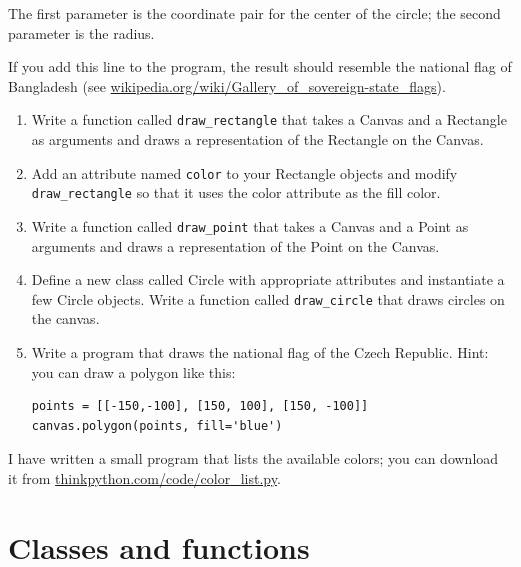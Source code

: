 \documentclass[10pt]{book}
\begin{document}
\begin{ex}

The first parameter is the coordinate pair for the center of the
circle; the second parameter is the radius.

If you add this line to the program, 
the result should resemble the national flag of Bangladesh
(see \url{wikipedia.org/wiki/Gallery_of_sovereign-state_flags}).

\begin{enumerate}

\item Write a function called \verb"draw_rectangle" that takes a
  Canvas and a Rectangle as arguments and draws a
  representation of the Rectangle on the Canvas.

\item Add an attribute named {\tt color} to your Rectangle objects and
  modify \verb"draw_rectangle" so that it uses the color attribute as
  the fill color.

\item Write a function called \verb"draw_point" that takes a
  Canvas and a Point as arguments and draws a
  representation of the Point on the Canvas.

\item Define a new class called Circle with appropriate attributes and
  instantiate a few Circle objects.  Write a function called
  \verb"draw_circle" that draws circles on the canvas.


\item Write a program that draws the national flag of the Czech Republic.
Hint: you can draw a polygon like this:

\beforeverb
\begin{verbatim}
points = [[-150,-100], [150, 100], [150, -100]]
canvas.polygon(points, fill='blue')
\end{verbatim}
\afterverb

\end{enumerate}


I have written a small program that lists the available colors;
you can download it from \url{thinkpython.com/code/color_list.py}.

\end{ex}



\chapter{Classes and functions}
\label{time}
\end{document}
